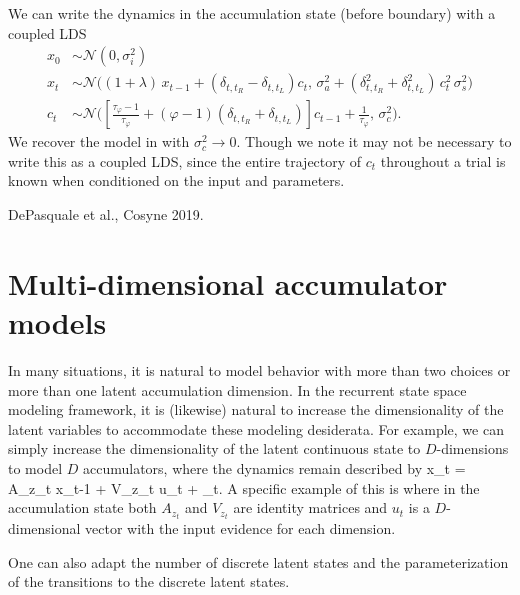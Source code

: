 \documentclass{article}
\begin{document}
We can write the dynamics in the accumulation state (before boundary) with a coupled LDS
\begin{align*}
x_0 & \sim \mathcal{N}(0, \sigma_i^2) \\
x_t & \sim \mathcal{N} \bigg((1 + \lambda) \, x_{t-1} + ( \delta_{t,t_R} -  \delta_{t,t_L} ) c_t , \, \sigma_a^2 + (\delta_{t,t_R}^2 + \delta_{t,t_L}^2)\,  c_t^2 \, \sigma_s^2 \bigg)\\
c_t & \sim \mathcal{N} \bigg(\left[ \frac{\tau_\varphi - 1}{\tau_\varphi} + (\varphi - 1) (\delta_{t,t_R} + \delta_{t,t_L}) \right] c_{t-1} + \frac{1}{\tau_\varphi}, \, \sigma_c^2 \bigg).
\end{align*}
We recover the model in \cite{brunton2013rats} with $\sigma_c^2 \rightarrow 0$. Though we note it may not be necessary to write this as a coupled LDS, since the entire trajectory of $c_t$ throughout a trial is known when conditioned on the input and parameters. 

DePasquale et al., Cosyne 2019.

\section{Multi-dimensional accumulator models}

In many situations, it is natural to model behavior with more than two choices or more than one latent accumulation dimension. In the recurrent state space modeling framework, it is (likewise) natural to increase the dimensionality of the latent variables to accommodate these modeling desiderata. For example, we can simply increase the dimensionality of the latent continuous state to $D$-dimensions to model $D$ accumulators, where the dynamics remain described by
\be
x_t = A_{z_t} x_{t-1} + V_{z_t} u_t + \epsilon_t.
\ee
A specific example of this is where in the accumulation state both $A_{z_t}$ and $V_{z_t}$ are identity matrices and $u_t$ is a $D$-dimensional vector with the input evidence for each dimension. 

One can also adapt the number of discrete latent states and the parameterization of the transitions to the discrete latent states. 
\end{document}
